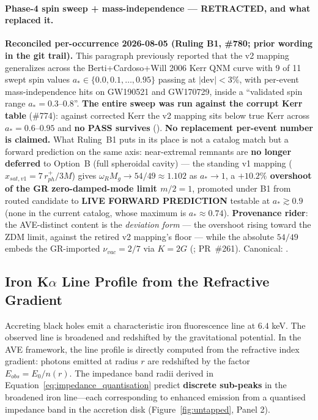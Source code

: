 \paragraph{Phase-4 spin sweep + mass-independence --- RETRACTED, and what replaced it.} \textbf{Reconciled per-occurrence 2026-08-05 (Ruling B1, \#780; prior wording in the git trail).} This paragraph previously reported that the v2 mapping generalizes across the Berti+Cardoso+Will 2006 Kerr QNM curve with 9 of 11 swept spin values $a_* \in \{0.0, 0.1, \ldots, 0.95\}$ passing at $|\text{dev}| < 3\%$, with per-event mass-independence hits on GW190521 and GW170729, inside a ``validated spin range $a_* = 0.3$--$0.8$''. \textbf{The entire sweep was run against the corrupt Kerr table} (\#774): against corrected Kerr the v2 mapping sits below true Kerr across $a_* = 0.6$--$0.95$ and \textbf{no PASS survives} (). \textbf{No replacement per-event number is claimed.} What Ruling~B1 puts in its place is not a catalog match but a forward prediction on the same axis: near-extremal remnants are \textbf{no longer deferred} to Option~B (full spheroidal cavity) --- the standing v1 mapping ($x_{sat,v1} = 7\,r_{ph}^+/3M$) gives $\omega_R M_g \to 54/49 \approx 1.102$ as $a_* \to 1$, a \textbf{$+10.2\%$ overshoot of the GR zero-damped-mode limit $m/2 = 1$}, promoted under B1 from routed candidate to \textbf{LIVE FORWARD PREDICTION} testable at $a_* \gtrsim 0.9$ (none in the current catalog, whose maximum is $a_* \approx 0.74$). \textbf{Provenance rider}: the AVE-distinct content is the \emph{deviation form} --- the overshoot rising toward the ZDM limit, against the retired v2 mapping's floor --- while the absolute $54/49$ embeds the GR-imported $\nu_{vac} = 2/7$ via $K = 2G$ (; PR~\#261). Canonical: .

\subsection{Iron K$\alpha$ Line Profile from the Refractive Gradient}

Accreting black holes emit a characteristic iron fluorescence line at $6.4$ keV. The observed line is broadened and redshifted by the gravitational potential. In the AVE framework, the line profile is directly computed from the refractive index gradient: photons emitted at radius $r$ are redshifted by the factor $E_{obs} = E_0 / n(r)$. The impedance band radii derived in Equation~\ref{eq:impedance_quantisation} predict \textbf{discrete sub-peaks} in the broadened iron line---each corresponding to enhanced emission from a quantised impedance band in the accretion disk (Figure~\ref{fig:untapped}, Panel 2).

